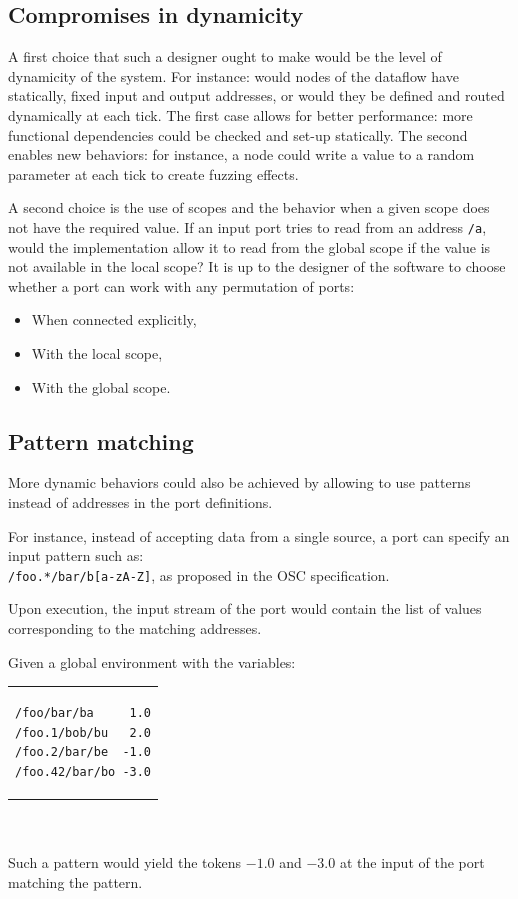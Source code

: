 \documentclass{article}
\begin{document}
\subsection{Compromises in dynamicity}
A first choice that such a designer ought to make would be the level of dynamicity of the system.
For instance: would nodes of the dataflow have statically, fixed input and output addresses, or would they be defined and routed dynamically at each tick.
The first case allows for better performance: more functional dependencies could be checked and set-up statically.
The second enables new behaviors: for instance, a node could write a value to a random parameter at each tick to create fuzzing effects.

A second choice is the use of scopes and the behavior when a given scope does not have the required value.
If an input port tries to read from an address \lstinline|/a|, would the implementation allow it to read from the global scope if the value is not available in the local scope?
It is up to the designer of the software to choose whether a port can work with any permutation of ports: 
\begin{itemize}
	\item When connected explicitly,
	\item With the local scope,
	\item With the global scope.
\end{itemize} 

\subsection{Pattern matching}
More dynamic behaviors could also be achieved by allowing to use patterns instead of addresses in the port definitions.

For instance, instead of accepting data from a single source, a port can specify an input pattern such as:~\\\lstinline|/foo.*/bar/b[a-zA-Z]|, as proposed in the OSC specification.

Upon execution, the input stream of the port would contain the list of values corresponding to the matching addresses.

Given a global environment with the variables:~\\
\begin{tabular}{c}
\begin{lstlisting}
/foo/bar/ba     1.0
/foo.1/bob/bu   2.0
/foo.2/bar/be  -1.0
/foo.42/bar/bo -3.0
\end{lstlisting}
\end{tabular}~\\~\\
Such a pattern would yield the tokens $-1.0$ and $-3.0$ at the input of the port matching the pattern.
\end{document}
